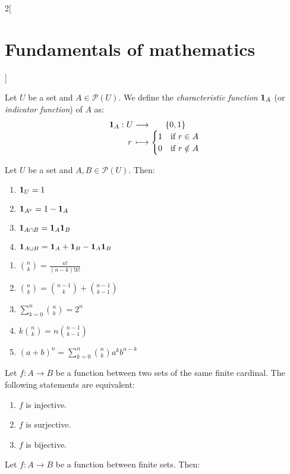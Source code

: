 \documentclass[../../../main_math.tex]{subfiles}
\begin{document}
\begin{multicols}{2}[\section{Fundamentals of mathematics}]
  \begin{definition}
    Let $U$ be a set and $A\in\mathcal{P}(U)$. We define the \emph{characteristic function} $\boldsymbol{\mathrm{1}}_{A}$ (or \emph{indicator function}) of $A$ as:
    $$
      \function{\indi{A}}{U}{\{0,1\}}{r}{
        \begin{cases}
          1 & \text{if }r\in A    \\
          0 & \text{if }r\notin A
        \end{cases}}
    $$
  \end{definition}
  \begin{proposition}
    Let $U$ be a set and $A,B\in\mathcal{P}(U)$. Then:
    \begin{enumerate}
      \item $\boldsymbol{\mathrm{1}}_{U}=1$
      \item $\boldsymbol{\mathrm{1}}_{A^c}=1-\boldsymbol{\mathrm{1}}_{A}$
      \item $\boldsymbol{\mathrm{1}}_{A\cap B}=\boldsymbol{\mathrm{1}}_{A}\boldsymbol{\mathrm{1}}_{B}$
      \item $\boldsymbol{\mathrm{1}}_{A\cup B}=\boldsymbol{\mathrm{1}}_{A}+\boldsymbol{\mathrm{1}}_{B}-\boldsymbol{\mathrm{1}}_{A}\boldsymbol{\mathrm{1}}_{B}$
    \end{enumerate}
  \end{proposition}
  \begin{proposition}\hfill
    \begin{enumerate}
      \item $\binom{n}{k}=\frac{n!}{(n-k)!k!}$
      \item $\binom{n}{k}=\binom{n-1}{k}+\binom{n-1}{k-1}$
      \item $\sum_{k=0}^n\binom{n}{k}=2^n$
      \item $k\binom{n}{k}=n\binom{n-1}{k-1}$
      \item $(a+b)^n=\sum_{k=0}^n\binom{n}{k}a^kb^{n-k}$
    \end{enumerate}
  \end{proposition}
  \begin{proposition}
    Let $f:A\rightarrow B$ be a function between two sets of the same finite cardinal. The following statements are equivalent:
    \begin{enumerate}
      \item $f$ is injective.
      \item $f$ is surjective.
      \item $f$ is bijective.
    \end{enumerate}
  \end{proposition}
  \begin{corollary}
    Let $f:A\rightarrow B$ be a function between finite sets. Then:

\end{corollary}
\end{multicols}
\end{document}
